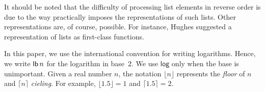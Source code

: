 It should be noted that the difficulty of processing list elements in
reverse order is due to the way \commonlisp{} practically imposes the
representations of such lists.  Other representations are, of course,
possible.  For instance, Hughes \cite{Hughes:1986} suggested a
representation of lists as first-class functions.

In this paper, we use the international convention \cite{ISO80000} for
writing logarithms.  Hence, we write $\mathsf{lb}\thinspace n$ for the
logarithm in base~$2$.  We use $\mathsf{log}$ only when the base is
unimportant.
Given a real number $n$, the notation
$\lfloor n \rfloor$ represents the \emph{floor} of $n$ 
and $\lceil n \rceil$ \emph{cieling}. For example, $\lfloor 1.5 \rfloor = 1$
and $\lceil 1.5 \rceil = 2$. 
